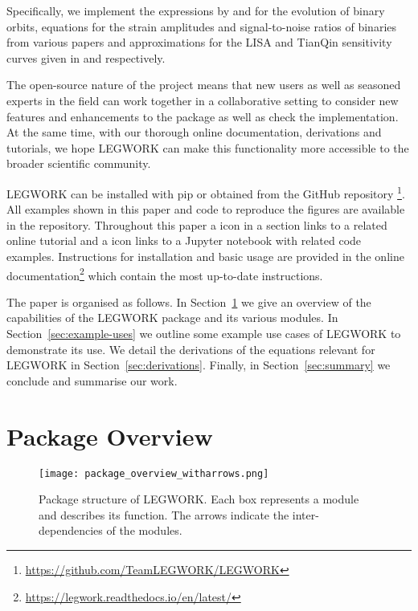 \documentclass[twocolumn]{aastex63}
\newcommand{\lw}{LEGWORK}
\newcommand{\lwColour}{SeaGreen}
\newcommand{\tutorialIcon}{{\color{\lwColour}{\faLaptopCode}}}
\newcommand{\notebookIcon}{{\color{\lwColour}{\faBook}}}
\begin{document}
Specifically, we implement the expressions by \citet{Peters+1963} and \citet{Peters+1964} for the evolution of binary orbits, equations for the strain amplitudes and signal-to-noise ratios of binaries from various papers \citep[e.g.][]{Flanagan+1998, Finn+2000, Barack+2004, Moore+2015} and approximations for the LISA and TianQin sensitivity curves given in \citet{Robson+2019} and \citet{Huang+2020} respectively.

The open-source nature of the project means that new users as well as seasoned experts in the field can work together in a collaborative setting to consider new features and enhancements to the package as well as check the implementation. At the same time, with our thorough online documentation, derivations and tutorials, we hope \lw{} can make this functionality more accessible to the broader scientific community.

\lw{} can be installed with pip or obtained from the GitHub repository \href{https://github.com/TeamLEGWORK/LEGWORK}{\faGithub}\footnote{\url{https://github.com/TeamLEGWORK/LEGWORK}}. All examples shown in this paper and code to reproduce the figures are available in the repository. Throughout this paper a \tutorialIcon{} icon in a section links to a related online tutorial and a \notebookIcon{} icon links to a Jupyter notebook with related code examples. Instructions for installation and basic usage are provided in the online documentation\footnote{\url{https://legwork.readthedocs.io/en/latest/}} which contain the most up-to-date instructions.

The paper is organised as follows. In Section~\ref{sec:LEGWORK-overview} we give an overview of the capabilities of the \lw{} package and its various modules. In Section~\ref{sec:example-uses} we outline some example use cases of \lw{} to demonstrate its use. We detail the derivations of the equations relevant for \lw{} in Section~\ref{sec:derivations}. Finally, in Section~\ref{sec:summary} we conclude and summarise our work.

\section{Package Overview}\label{sec:LEGWORK-overview}

\begin{figure}
    \centering
    \texttt{[image: package\_overview\_witharrows.png]}
    \caption{Package structure of \lw{}. Each box represents a module and describes its function. The arrows indicate the inter-dependencies of the modules.}
    \label{fig:package_overview}
\end{figure}
\end{document}
